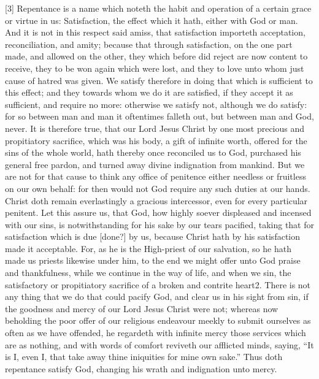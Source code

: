 [3] Repentance is a name which noteth the habit and operation of a certain grace or virtue in us: Satisfaction, the effect which it hath, either with God or man. And it is not in this respect said amiss, that satisfaction importeth acceptation, reconciliation, and amity; because that through satisfaction, on the one part made, and allowed on the other, they which before did reject are now content to receive, they to be won again which were lost, and they to love unto whom just cause of hatred was given. We satisfy therefore in doing  that which is sufficient to this effect; and they towards whom we do it are satisfied, if they accept it as sufficient, and require no more: otherwise we satisfy not, although we do satisfy: for so between man and man it oftentimes falleth out, but between man and God, never. It is therefore true, that our Lord Jesus Christ by one most precious and propitiatory sacrifice, which was his body, a gift of infinite worth, offered for the sins of the whole world, hath thereby once reconciled us to God, purchased his general free pardon, and turned away divine indignation from mankind. But we are not for that cause to think any office of penitence either needless or fruitless on our own behalf: for then would not God require any such duties at our hands. Christ doth remain everlastingly a gracious intercessor, even for every particular penitent. Let this assure us, that God, how highly soever displeased and incensed with our sins, is notwithstanding for his sake by our tears pacified, taking that for satisfaction which is due [done?] by us, because Christ hath by his satisfaction made it acceptable. For, as he is the High-priest of our salvation, so he hath made us priests likewise under him, to the end we might offer unto God praise and thankfulness, while we continue in the way of life, and when we sin, the satisfactory or propitiatory sacrifice of a broken and contrite heart2. There is not any thing that we do that could pacify God, and clear us in his sight from sin, if the goodness and mercy of our Lord Jesus Christ were not; whereas now beholding the poor offer of our religious endeavour meekly to submit ourselves as often as we have offended, he regardeth with infinite mercy those services which are as nothing, and with words of comfort reviveth our afflicted minds, saying, “It is I, even I, that take away thine iniquities for mine own sake.” Thus doth repentance satisfy God, changing his wrath and indignation unto mercy.


